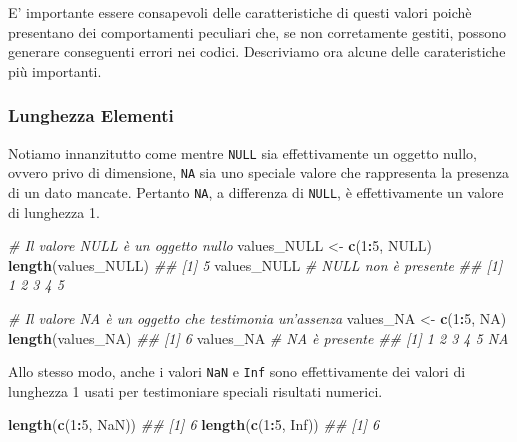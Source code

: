 \documentclass[
]{book}
\newenvironment{Shaded}{\begin{snugshade}}{\end{snugshade}}
\newcommand{\CommentTok}[1]{\textcolor[rgb]{0.56,0.35,0.01}{\textit{#1}}}
\newcommand{\DecValTok}[1]{\textcolor[rgb]{0.00,0.00,0.81}{#1}}
\newcommand{\KeywordTok}[1]{\textcolor[rgb]{0.13,0.29,0.53}{\textbf{#1}}}
\newcommand{\NormalTok}[1]{#1}
\newcommand{\OperatorTok}[1]{\textcolor[rgb]{0.81,0.36,0.00}{\textbf{#1}}}
\newcommand{\OtherTok}[1]{\textcolor[rgb]{0.56,0.35,0.01}{#1}}
\newcommand{\StringTok}[1]{\textcolor[rgb]{0.31,0.60,0.02}{#1}}
\begin{document}
E' importante essere consapevoli delle caratteristiche di questi valori poichè presentano dei comportamenti peculiari che, se non corretamente gestiti, possono generare conseguenti errori nei codici. Descriviamo ora alcune delle carateristiche più importanti.

\hypertarget{lunghezza-elementi}{%
\subsubsection*{Lunghezza Elementi}\label{lunghezza-elementi}}

Notiamo innanzitutto come mentre \texttt{NULL} sia effettivamente un oggetto nullo, ovvero privo di dimensione, \texttt{NA} sia uno speciale valore che rappresenta la presenza di un dato mancate. Pertanto \texttt{NA}, a differenza di \texttt{NULL}, è effettivamente un valore di lunghezza 1.

\begin{Shaded}
\begin{Highlighting}[]
\CommentTok{# Il valore NULL è un oggetto nullo}
\NormalTok{values_NULL <-}\StringTok{ }\KeywordTok{c}\NormalTok{(}\DecValTok{1}\OperatorTok{:}\DecValTok{5}\NormalTok{, }\OtherTok{NULL}\NormalTok{)}
\KeywordTok{length}\NormalTok{(values_NULL)}
\CommentTok{## [1] 5}
\NormalTok{values_NULL }\CommentTok{# NULL non è presente}
\CommentTok{## [1] 1 2 3 4 5}

\CommentTok{# Il valore NA è un oggetto che testimonia un'assenza}
\NormalTok{values_NA <-}\StringTok{ }\KeywordTok{c}\NormalTok{(}\DecValTok{1}\OperatorTok{:}\DecValTok{5}\NormalTok{, }\OtherTok{NA}\NormalTok{)}
\KeywordTok{length}\NormalTok{(values_NA)}
\CommentTok{## [1] 6}
\NormalTok{values_NA   }\CommentTok{# NA è presente}
\CommentTok{## [1]  1  2  3  4  5 NA}
\end{Highlighting}
\end{Shaded}

Allo stesso modo, anche i valori \texttt{NaN} e \texttt{Inf} sono effettivamente dei valori di lunghezza 1 usati per testimoniare speciali risultati numerici.

\begin{Shaded}
\begin{Highlighting}[]
\KeywordTok{length}\NormalTok{(}\KeywordTok{c}\NormalTok{(}\DecValTok{1}\OperatorTok{:}\DecValTok{5}\NormalTok{, }\OtherTok{NaN}\NormalTok{))}
\CommentTok{## [1] 6}
\KeywordTok{length}\NormalTok{(}\KeywordTok{c}\NormalTok{(}\DecValTok{1}\OperatorTok{:}\DecValTok{5}\NormalTok{, }\OtherTok{Inf}\NormalTok{))}
\CommentTok{## [1] 6}
\end{Highlighting}
\end{Shaded}
\end{document}
